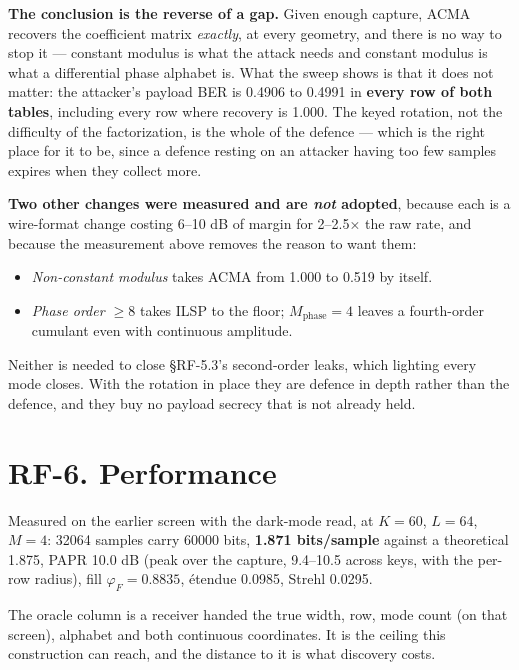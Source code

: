 \documentclass[10pt,letterpaper,twocolumn]{article}
\providecommand{\tightlist}{\setlength{\itemsep}{0pt}\setlength{\parskip}{0pt}}
\begin{document}
\textbf{The conclusion is the reverse of a gap.} Given enough capture, ACMA recovers the coefficient matrix \emph{exactly}, at every geometry, and there is no way to stop it --- constant modulus is what the attack needs and constant modulus is what a differential phase alphabet is. What the sweep shows is that it does not matter: the attacker's payload BER is 0.4906 to 0.4991 in \textbf{every row of both tables}, including every row where recovery is 1.000. The keyed rotation, not the difficulty of the factorization, is the whole of the defence --- which is the right place for it to be, since a defence resting on an attacker having too few samples expires when they collect more.

\textbf{Two other changes were measured and are \emph{not} adopted}, because each is a wire-format change costing 6--10 dB of margin for 2--2.5× the raw rate, and because the measurement above removes the reason to want them:

\begin{itemize}
\tightlist
\item
  \emph{Non-constant modulus} takes ACMA from 1.000 to 0.519 by itself.
\item
  \emph{Phase order \(\ge 8\)} takes ILSP to the floor; \(M_{\text{phase}} = 4\) leaves a fourth-order cumulant even with continuous amplitude.
\end{itemize}

Neither is needed to close §RF-5.3's second-order leaks, which lighting every mode closes. With the rotation in place they are defence in depth rather than the defence, and they buy no payload secrecy that is not already held.

\section{RF-6. Performance}\label{rf-6-performance}

Measured on the earlier screen with the dark-mode read, at \(K=60\), \(L=64\), \(M=4\): 32064 samples carry 60000 bits, \textbf{1.871 bits/sample} against a theoretical 1.875, PAPR 10.0 dB (peak over the capture, 9.4--10.5 across keys, with the per-row radius), fill \(\varphi_F = 0.8835\), étendue 0.0985, Strehl 0.0295.

The oracle column is a receiver handed the true width, row, mode count (on that screen), alphabet and both continuous coordinates. It is the ceiling this construction can reach, and the distance to it is what discovery costs.
\end{document}
